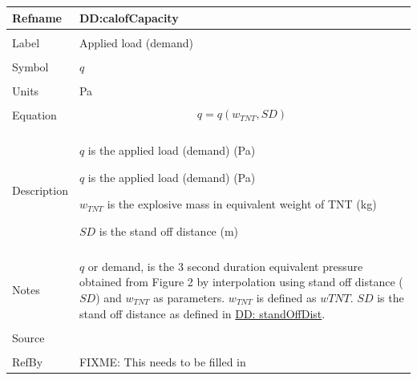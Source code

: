 \documentclass[12pt]{article}
\begin{document}
\noindent \begin{minipage}{\textwidth}
\begin{tabular}{p{} p{}}
\toprule \textbf{Refname} & \textbf{DD:calofCapacity}
\label{DD:calofCapacity}
\\ \midrule \\
Label & Applied load (demand)
\\ \midrule \\
Symbol & $q$
\\ \midrule \\
Units & Pa
\\ \midrule \\
Equation & \begin{dmath}
           q=q\left({w_{TNT}},SD\right)
           \end{dmath}
\\ \midrule \\
Description & \begin{symbDescription}
              \item{$q$ is the applied load (demand) (Pa)}
              \item{$q$ is the applied load (demand) (Pa)}
              \item{${w_{TNT}}$ is the explosive mass in equivalent weight of TNT (kg)}
              \item{$SD$ is the stand off distance (m)}
              \end{symbDescription}
\\ \midrule \\
Notes & $q$ or demand, is the 3 second duration equivalent pressure obtained from Figure 2 by interpolation using stand off distance ($SD$) and ${w_{TNT}}$ as parameters. ${w_{TNT}}$ is defined as $w TNT$. $SD$ is the stand off distance as defined in \hyperref[DD:standOffDist]{DD: standOffDist}.
\\ \midrule \\
Source & \cite{astm2009}
\\ \midrule \\
RefBy & FIXME: This needs to be filled in
\\ \bottomrule \end{tabular}
\end{minipage}\\
\end{document}
